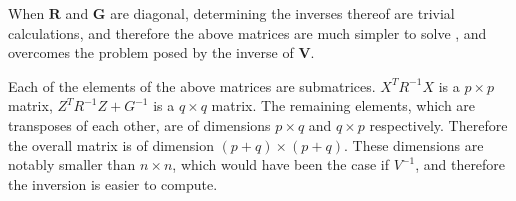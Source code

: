 \documentclass[12pt, a4paper]{report}
\theoremstyle{plain}
\theoremstyle{definition}
\theoremstyle{remark}
\begin{document}

When $\textbf{R}$ and $\textbf{G}$  are diagonal, determining the
inverses thereof are trivial calculations, and therefore the above
matrices are much simpler to solve , and overcomes the problem
posed by the inverse of \textbf{V}.

Each of the elements of the above matrices are submatrices.
$X^{T}R^{-1}X$ is a $p \times p$ matrix, $Z^{T}R^{-1}Z + G^{-1}$
is a $q \times q$ matrix. The remaining elements, which are
transposes of each other, are of dimensions $p \times q$ and $q
\times p$ respectively. Therefore the overall matrix is of
dimension $(p+q) \times (p+q)$. These dimensions are notably
smaller than $n \times n$, which would have been the case if
$V^{-1}$, and therefore the inversion is easier to compute.




\end{document}
